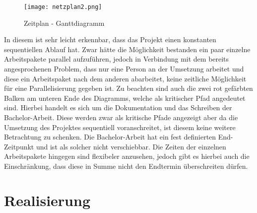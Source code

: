 \begin{figure}[H]
\centering
\texttt{[image: netzplan2.png]}
\caption{Zeitplan - Ganttdiagramm}
\label{fig:benchsnmpbulk}
\end{figure}

In diesem ist sehr leicht erkennbar, dass das Projekt einen konstanten sequentiellen Ablauf hat.
Zwar hätte die Möglichkeit bestanden ein paar einzelne Arbeitspakete parallel aufzuführen, jedoch in Verbindung mit dem bereits angesprochenen Problem, dass nur eine Person an der Umsetzung arbeitet und diese ein Arbeitspaket nach dem anderen abarbeitet, keine zeitliche Möglichkeit für eine Parallelisierung gegeben ist.
Zu beachten sind auch die zwei rot gefärbten Balken am unteren Ende des Diagramms, welche als kritischer Pfad angedeutet sind. Hierbei handelt es sich um die Dokumentation und das Schreiben der Bachelor-Arbeit. Diese werden zwar als kritische Pfade angezeigt aber da die Umsetzung des Projektes sequentiell voranschreitet, ist diesem keine weitere Betrachtung zu schenken. Die Bachelor-Arbeit hat ein fest definierten End-Zeitpunkt und ist als solcher nicht verschiebbar. Die Zeiten der einzelnen Arbeitspakete hingegen sind flexibeler anzusehen, jedoch gibt es hierbei auch die Einschränkung, dass diese in Summe nicht den Endtermin überschreiten dürfen.

\section{Realisierung}
\label{sec:implementation}

